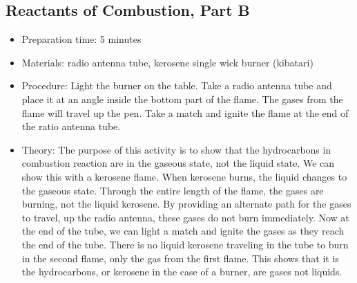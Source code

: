 \subsection{Reactants of Combustion, Part B}
\begin{itemize}
\item{Preparation time: 5 minutes}
\item{Materials: radio antenna tube, kerosene single wick burner (kibatari)}
\item{Procedure: Light the burner on the table. Take a radio antenna tube and place it at an angle inside the bottom part of the flame. The gases from the flame will travel up the pen. Take a match and ignite the flame at the end of the ratio antenna tube. }
\item{Theory: The purpose of this activity is to show that the hydrocarbons in combustion reaction are in the gaseous state, not the liquid state. We can show this with a kerosene flame. When kerosene burns, the liquid changes to the gaseous state. Through the entire length of the flame, the gases are burning, not the liquid kerosene. By providing an alternate path for the gases to travel, up the radio antenna, these gases do not burn immediately. Now at the end of the tube, we can light a match and ignite the gases as they reach the end of the tube. There is no liquid kerosene traveling in the tube to burn in the second flame, only the gas from the first flame. This shows that it is the hydrocarbons, or kerosene in the case of a burner, are gases not liquids. }
\end{itemize}

